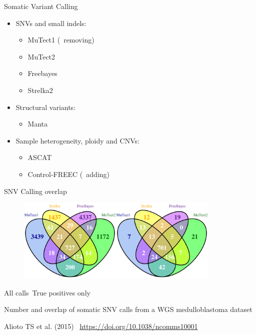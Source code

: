 \documentclass[usepdftitle=false]{beamer}
\begin{document}
\begin{frame}{Somatic Variant Calling}
	\begin{itemize}
		\item SNVs and small indels:
		\pause
		\begin{itemize}
			\item MuTect1 (\faWrench\ removing)
			\item MuTect2
			\item Freebayes
			\item Strelka2
		\end{itemize}
		\pause
		\item Structural variants:
		\pause
		\begin{itemize}
			\item Manta
		\end{itemize}
		\pause
		\item Sample heterogeneity, ploidy and CNVs:
		\pause
		\begin{itemize}
			\item ASCAT
			\item Control-FREEC (\faWrench\ adding)
		\end{itemize}
	\end{itemize}
\end{frame}

\begin{frame}{SNV Calling overlap}
	\begin{figure}
		\includegraphics[height=4cm]{pictures/Sarek_venn_Calls.png}
	\end{figure}
		\vspace{-.5cm}
		\begin{center}
			\small{All calls\hspace{2cm}\ True positives only}
		\end{center}

		\small{Number and overlap of somatic SNV calls from a WGS medulloblastoma dataset}

	\small{Alioto TS et al. (2015) \aiDoi\ \url{https://doi.org/10.1038/ncomms10001}}
\end{frame}
\end{document}
